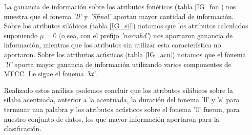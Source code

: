 La ganancia de información sobre los atributos fonéticos (tabla \ref{IG_fon}) nos muestra que el fonema \textit{'ll'} y \textit{'Sfinal'} aportan mayor cantidad de información. Sobre los atributos silábicos (tabla \ref{IG_sil}) notamos que los atributos calculados suponiendo $\mu = 0$ (o sea, con el prefijo \textit{'normhd'}) nos aportaron ganancia de información, mientras que los atributos sin utilizar esta característica no aportaron. Sobre los atributos acústicos (tabla \ref{IG_acu}) notamos que el fonema \textit{'ll'} aporta mayor ganancia de información utilizando varios componentes de MFCC. Le sigue el fonema \textit{'kt'}. 

Realizado estos análisis podemos concluir que los atributos silábicos sobre la silaba acentuada, anterior a la acentuada, la duración del fonema 'll' y 's' para terminar una palabra y los atributos acústicos sobre el fonema 'll' fueron, para nuestro conjunto de datos, los que mayor información aportaron para la clasificación.




